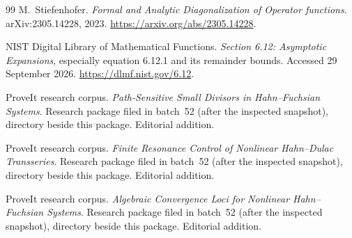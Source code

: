 \documentclass[11pt,a4paper]{article}
\numberwithin{equation}{section}
\theoremstyle{definition}
\theoremstyle{remark}\newtheorem{remark}[theorem]{Remark}
\begin{document}
\begin{thebibliography}{99}
M.~Stiefenhofer.
\emph{Formal and Analytic Diagonalization of Operator functions}.
arXiv:2305.14228, 2023.
\url{https://arxiv.org/abs/2305.14228}.

NIST Digital Library of Mathematical Functions.
\emph{Section 6.12: Asymptotic Expansions}, especially equation 6.12.1 and its remainder bounds.
Accessed 29 September 2026.
\url{https://dlmf.nist.gov/6.12}.

ProveIt research corpus.
\emph{Path-Sensitive Small Divisors in Hahn--Fuchsian Systems}.
Research package filed in batch~52 (after the inspected snapshot), directory  beside this package. Editorial addition.

ProveIt research corpus.
\emph{Finite Resonance Control of Nonlinear Hahn--Dulac Transseries}.
Research package filed in batch~52 (after the inspected snapshot), directory  beside this package. Editorial addition.

ProveIt research corpus.
\emph{Algebraic Convergence Loci for Nonlinear Hahn--Fuchsian Systems}.
Research package filed in batch~52 (after the inspected snapshot), directory  beside this package. Editorial addition.
\end{thebibliography}
\end{document}
